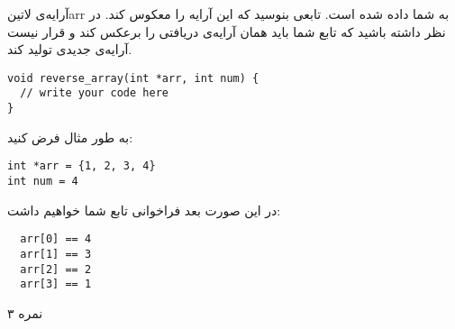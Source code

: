 \documentclass[../main.tex]{subfiles}
\begin{document}

آرایه‌ی ‌لاتین{arr} به شما داده شده است. تابعی بنوسید که این آرایه را معکوس کند.
در نظر داشته باشید که تابع شما باید همان آرایه‌ی دریافتی را برعکس کند و قرار نیست آرایه‌ی جدیدی تولید کند.

\begin{latin}
\begin{verbatim}
void reverse_array(int *arr, int num) {
  // write your code here
}
\end{verbatim}
\end{latin}

به طور مثال فرض کنید:

\begin{latin}
\begin{verbatim}
int *arr = {1, 2, 3, 4}
int num = 4
\end{verbatim}
\end{latin}

در این صورت بعد فراخوانی تابع شما خواهیم داشت:

\begin{latin}
\begin{verbatim}
  arr[0] == 4
  arr[1] == 3
  arr[2] == 2
  arr[3] == 1
\end{verbatim}
\end{latin}

۳ نمره
\end{document}
